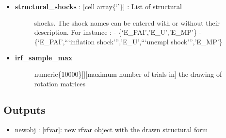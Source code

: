 \documentclass[letterpaper,10pt,english]{sphinxmanual}
\begin{document}
\begin{itemize}
\begin{itemize}
\begin{description}
\end{description}

\item {} \begin{description}
\item[{\textbf{structural\_shocks} : {[}cell array\textbar{}\{`'\}{]} : List of structural}] \leavevmode
shocks. The shock names can be entered with or without their
description. For instance :
- \{`E\_PAI','E\_U','E\_MP'\}
- \{`E\_PAI',```inflation shock''','E\_U',```unempl shock''','E\_MP'\}

\end{description}

\item {} \begin{description}
\item[{\textbf{irf\_sample\_max}}] \leavevmode{[}{[}numeric\textbar{}\{10000\}{]}{]}{[}maximum number of trials in{]}
the drawing of rotation matrices

\end{description}

\end{itemize}

\end{itemize}


\subsection{Outputs}
\label{classes/models/@rfvar/rfvar:id169}\begin{itemize}
\item {} 
newobj : {[}rfvar{]}: new rfvar object with the drawn structural form

\end{itemize}
\end{document}
